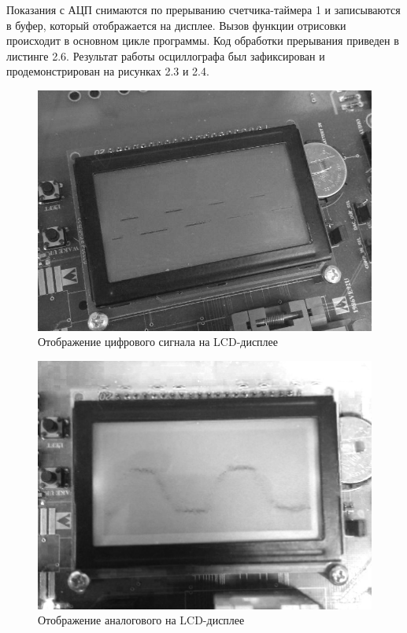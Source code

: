 \documentclass[14pt,a4paper,report]{report}
\begin{document}
Показания с АЦП снимаются по прерыванию счетчика-таймера 1 и записываются в буфер, который отображается на дисплее. Вызов функции отрисовки происходит в основном цикле программы. Код обработки прерывания приведен в листинге 2.6. Результат работы осциллографа был зафиксирован и продемонстрирован на рисунках 2.3 и 2.4.



\begin{figure}[h!]
	\centering
	\includegraphics[scale = 0.75]{img/2_3chb.png}
	\caption{Отображение цифрового сигнала на LCD-дисплее}
\end{figure}

\begin{figure}[h!]
	\centering
	\includegraphics[scale = 0.65]{img/2_4.png}
	\caption{Отображение аналогового на LCD-дисплее}
\end{figure}
\end{document}
